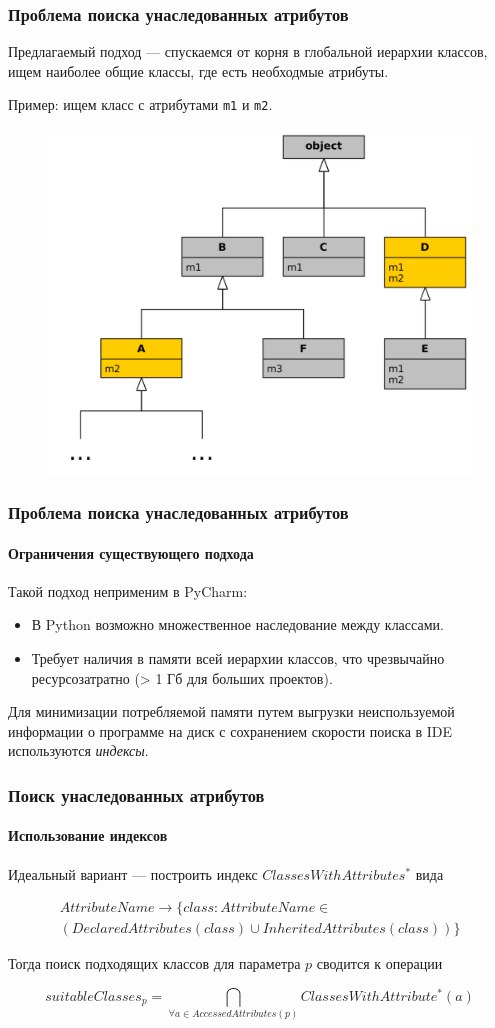 \documentclass[handout]{beamer}
\begin{document}
\begin{frame}
  \frametitle{Проблема поиска унаследованных атрибутов}
  Предлагаемый подход --- спускаемся от корня в глобальной иерархии классов,
  ищем наиболее общие классы, где есть необходмые атрибуты.

  Пример: ищем класс с атрибутами \texttt{m1} и \texttt{m2}.
  \begin{figure}
    \begin{center}
      \includegraphics[width=0.6\linewidth]{fig/class-search-example.png}
    \end{center}
  \end{figure}
\end{frame}

\begin{frame}
  \frametitle{Проблема поиска унаследованных атрибутов}
  \framesubtitle{Ограничения существующего подхода}

  Такой подход неприменим в PyCharm:
  \begin{itemize}
    \item В Python возможно множественное наследование между классами.

    \item Требует наличия в памяти всей иерархии классов, что чрезвычайно
      ресурсозатратно (> 1 Гб для больших проектов).
  \end{itemize}

  Для минимизации потребляемой памяти путем выгрузки неиспользуемой информации о
  программе на диск с сохранением скорости поиска в IDE используются
  \emph{индексы}.
  
\end{frame}

\begin{frame}
  \frametitle{Поиск унаследованных атрибутов}
  \framesubtitle{Использование индексов}
  
  Идеальный вариант --- построить индекс $ClassesWithAttributes^*$ вида

  \begin{multline*}
    AttributeName \rightarrow \{class: AttributeName \in \\
  (DeclaredAttributes(class) \cup InheritedAttributes(class)) \}
  \end{multline*}

  Тогда поиск подходящих классов для параметра $p$ сводится к операции

  \[
    suitableClasses_p = \bigcap\limits_{\forall{a} \in AccessedAttributes(p)}
    ClassesWithAttribute^*(a)
  \]
  
\end{frame}
\end{document}
